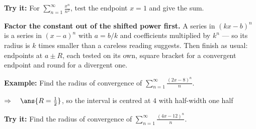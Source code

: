 \documentclass[12pt]{article}
\begin{document}
\begin{tryitbox}
\textbf{Try it:} \quad For $\displaystyle\sum_{n=1}^{\infty}\frac{x^{n}}{n^{2}}$, test the endpoint $x = 1$ and give the sum.\\[2pt]
\end{tryitbox}


\begin{formulabox}
\textbf{Factor the constant out of the shifted power first.} A series in $(kx - b)^{n}$ is a series in $(x - a)^{n}$ with $a = b/k$ and coefficients multiplied by $k^{n}$ --- so its radius is $k$ times smaller than a careless reading suggests. Then finish as usual: endpoints at $a \pm R$, each tested on its own, square bracket for a convergent endpoint and round for a divergent one.
\end{formulabox}

\begin{examplebox}
\textbf{Example:} \quad Find the radius of convergence of $\displaystyle\sum_{n=1}^{\infty}\frac{(2x-8)^{n}}{n}$.

$\Rightarrow\quad \ans{R = \frac{1}{2}}$, so the interval is centred at $4$ with half-width one half
\end{examplebox}

\begin{tryitbox}
\textbf{Try it:} \quad Find the radius of convergence of $\displaystyle\sum_{n=1}^{\infty}\frac{(4x-12)^{n}}{n}$.\\[2pt]
\end{tryitbox}
\end{document}
